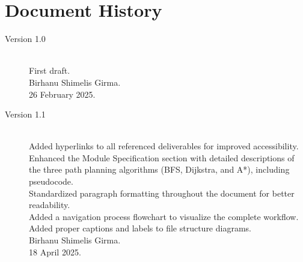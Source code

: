 \documentclass{CSSRforAfrica}
\begin{document}
\newpage
\section*{Document History}
\label{document_history}

\begin{description}
	
	\item [Version 1.0]~\\
	First draft. \\
	Birhanu Shimelis Girma. \\
	26 February 2025.
	
	\item [Version 1.1]~\\
	Added hyperlinks to all referenced deliverables for improved accessibility. \\
	Enhanced the Module Specification section with detailed descriptions of the three path planning algorithms (BFS, Dijkstra, and A*), including pseudocode. \\
	Standardized paragraph formatting throughout the document for better readability. \\
	Added a navigation process flowchart to visualize the complete workflow. \\
	Added proper captions and labels to file structure diagrams. \\
	Birhanu Shimelis Girma. \\
	18 April 2025.
	
\end{description}
\end{document}

